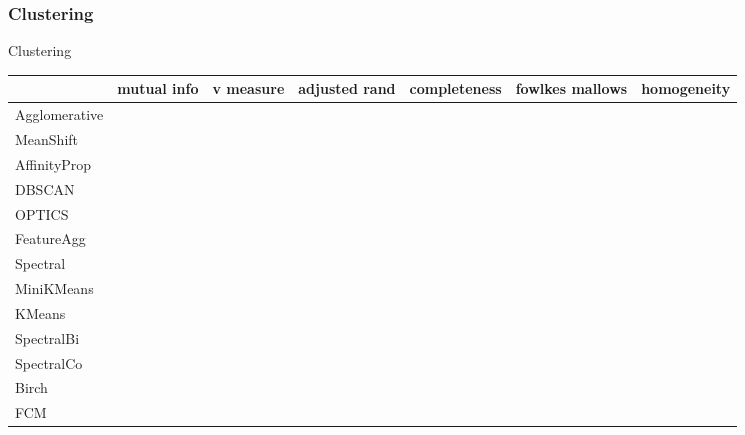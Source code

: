 \subsubsection{Clustering}
\begin{frame}{Clustering}{}

\footnotesize
\begin{tabular}{lllllll}
	\                       &  mutual info & v measure & adjusted rand & completeness & fowlkes mallows & homogeneity  \\\hline
	Agglomerative           &                 &           &               &              &                 &           \\
	MeanShift               &                 &           &               &              &                 &           \\
	AffinityProp            &                 &           &               &              &                 &           \\
	DBSCAN                  &                 &           &               &              &                 &           \\
	OPTICS                  &                 &           &               &              &                 &           \\
	FeatureAgg              &                 &           &               &              &                 &           \\
	Spectral                &                 &           &               &              &                 &           \\
	MiniKMeans              &                 &           &               &              &                 &           \\
	KMeans                  &                 &           &               &              &                 &           \\
	SpectralBi              &                 &           &               &              &                 &           \\
	SpectralCo              &                 &           &               &              &                 &           \\
	Birch                   &                 &           &               &              &                 &           \\
	FCM                     &                 &           &               &              &                 &           \\\hline
\end{tabular}

\end{frame}